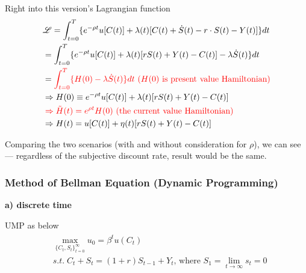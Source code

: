 \documentclass{article}
\begin{document}
Right into this version's Lagrangian function
\begin{align}
&\mathscr{L}=\int_{t=0}^{T} \{e^{-\rho t}u[C(t)]+\lambda(t)[C(t)+\dot{S}(t)-r \cdot S(t)-Y(t)]\}dt
\\&=\int_{t=0}^{T} \{e^{-\rho t} u[C(t)]+\lambda(t)[r S(t)+Y(t)-C(t)]-\lambda \dot S(t)\}dt
\\&=\color{red}\int_{t=0}^{T} \{H(0)-\lambda \dot S(t)\}dt \text{ (} H(0) \text{ is present value Hamiltonian)}
\\& \Rightarrow H(0)\equiv e^{-\rho t} u[C(t)]+\lambda(t)[r S(t)+Y(t)-C(t)]
\\& \color{red} \Rightarrow \tilde{H}(t)= e^{\rho t}H(0) \text{ (the current value Hamiltonian)}
\\& \Rightarrow H(t)=u[C(t)]+\eta(t)[r S(t)+Y(t)-C(t)]
\end{align}

Comparing the two scenarios (with and without consideration for
$\rho$), we can see --- regardless of the subjective discount rate, result would be the same.

\subsubsection{Method of Bellman Equation (Dynamic
Programming)}\label{method-of-bellman-equation-dynamic-programming}

\textbf{a) discrete time} 

UMP as below
\begin{align}
\begin{split}
&\max_{\{C_{t}, S_{t}\}_{t=0}^{\infty}} u_{0}=\beta^{t}u(C_{t})
\\&s.t. \; C_{t}+S_{t}=(1+r)S_{t-1}+Y_{t} \text{, where }S_{1}=\lim_{t \rightarrow \infty} s_{t}=0
\end{split}
\end{align}
\end{document}
